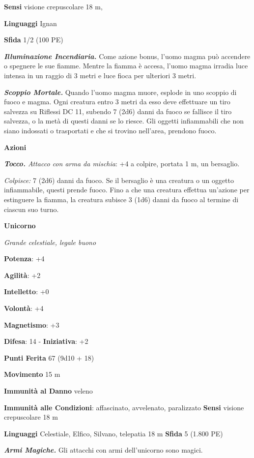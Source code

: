 \begin{multicols}{2}
\textbf{Sensi} visione crepuscolare 18 m, 

\textbf{Linguaggi} Ignan

\textbf{Sfida} 1/2 (100 PE)\smallskip

\emph{\textbf{Illuminazione Incendiaria.}} Come azione bonus, l'uomo
magma può accendere o spegnere le sue fiamme. Mentre la fiamma è accesa,
l'uomo magma irradia luce intensa in un raggio di 3 metri e luce fioca
per ulteriori 3 metri.

\emph{\textbf{Scoppio Mortale.}} Quando l'uomo magma muore, esplode in
uno scoppio di fuoco e magma. Ogni creatura entro 3 metri da esso deve
effettuare un tiro salvezza su Riflessi DC 11, subendo 7 (2d6) danni da
fuoco se fallisce il tiro salvezza, o la metà di questi danni se lo
riesce. Gli oggetti infiammabili che non siano indossati o trasportati e
che si trovino nell'area, prendono fuoco.

\smallskip\textbf{Azioni}

\emph{\textbf{Tocco.} Attacco con arma da mischia}: +4 a colpire,
portata 1 m, un bersaglio.

\emph{Colpisce:} 7 (2d6) danni da fuoco. Se il bersaglio è una creatura
o un oggetto infiammabile, questi prende fuoco. Fino a che una creatura
effettua un'azione per estinguere la fiamma, la creatura subisce 3 (1d6)
danni da fuoco al termine di ciascun suo turno.

\textbf{Unicorno}

\emph{Grande celestiale, legale buono}

\textbf{Potenza}: +4

\textbf{Agilità}: +2

\textbf{Intelletto}: +0

\textbf{Volontà}: +4

\textbf{Magnetismo}: +3

\textbf{Difesa}: 14 - \textbf{Iniziativa}: +2

\textbf{Punti Ferita} 67 (9d10 + 18)

\textbf{Movimento} 15 m

\textbf{Immunità al Danno} veleno

\textbf{Immunità alle Condizioni}: affascinato, avvelenato, paralizzato
\textbf{Sensi} visione crepuscolare 18 m

\textbf{Linguaggi} Celestiale, Elfico, Silvano, telepatia 18 m
\textbf{Sfida} 5 (1.800 PE)\smallskip

\emph{\textbf{Armi Magiche.}} Gli attacchi con armi dell'unicorno sono
magici.


\end{multicols}
